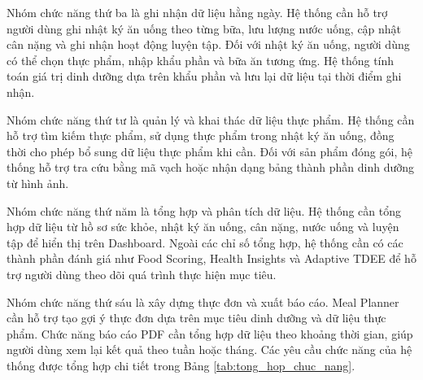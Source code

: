 \documentclass[12pt, a4paper]{report}
\begin{document}
Nhóm chức năng thứ ba là ghi nhận dữ liệu hằng ngày. Hệ thống cần hỗ trợ người dùng ghi nhật ký ăn uống theo từng bữa, lưu lượng nước uống, cập nhật cân nặng và ghi nhận hoạt động luyện tập. Đối với nhật ký ăn uống, người dùng có thể chọn thực phẩm, nhập khẩu phần và bữa ăn tương ứng. Hệ thống tính toán giá trị dinh dưỡng dựa trên khẩu phần và lưu lại dữ liệu tại thời điểm ghi nhận.

Nhóm chức năng thứ tư là quản lý và khai thác dữ liệu thực phẩm. Hệ thống cần hỗ trợ tìm kiếm thực phẩm, sử dụng thực phẩm trong nhật ký ăn uống, đồng thời cho phép bổ sung dữ liệu thực phẩm khi cần. Đối với sản phẩm đóng gói, hệ thống hỗ trợ tra cứu bằng mã vạch hoặc nhận dạng bảng thành phần dinh dưỡng từ hình ảnh.

Nhóm chức năng thứ năm là tổng hợp và phân tích dữ liệu. Hệ thống cần tổng hợp dữ liệu từ hồ sơ sức khỏe, nhật ký ăn uống, cân nặng, nước uống và luyện tập để hiển thị trên Dashboard. Ngoài các chỉ số tổng hợp, hệ thống cần có các thành phần đánh giá như Food Scoring, Health Insights và Adaptive TDEE để hỗ trợ người dùng theo dõi quá trình thực hiện mục tiêu.

Nhóm chức năng thứ sáu là xây dựng thực đơn và xuất báo cáo. Meal Planner cần hỗ trợ tạo gợi ý thực đơn dựa trên mục tiêu dinh dưỡng và dữ liệu thực phẩm. Chức năng báo cáo PDF cần tổng hợp dữ liệu theo khoảng thời gian, giúp người dùng xem lại kết quả theo tuần hoặc tháng. Các yêu cầu chức năng của hệ thống được tổng hợp chi tiết trong Bảng \ref{tab:tong_hop_chuc_nang}.
\end{document}
